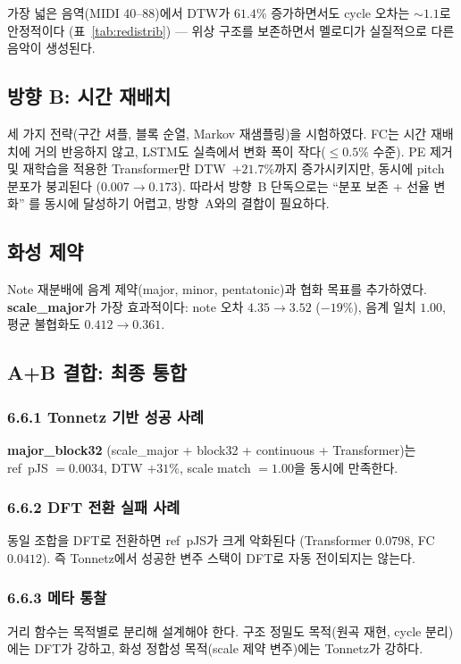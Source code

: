 \documentclass[11pt,a4paper]{article}
\begin{document}
가장 넓은 음역(MIDI 40--88)에서 DTW가 $61.4\%$ 증가하면서도
cycle 오차는 $\sim 1.1$로 안정적이다 (표~\ref{tab:redistrib}) ---
위상 구조를 보존하면서 멜로디가 실질적으로 다른 음악이 생성된다.

\subsection{방향 B: 시간 재배치}
\label{subsec:dirB}

세 가지 전략(구간 셔플, 블록 순열, Markov 재샘플링)을 시험하였다.
FC는 시간 재배치에 거의 반응하지 않고, LSTM도 실측에서 변화 폭이
작다($\le 0.5\%$ 수준). PE 제거 및 재학습을 적용한 Transformer만
DTW~$+21.7\%$까지 증가시키지만, 동시에 pitch 분포가 붕괴된다
($0.007 \to 0.173$). 따라서 방향~B 단독으로는 ``분포 보존 + 선율 변화''
를 동시에 달성하기 어렵고, 방향~A와의 결합이 필요하다.

\subsection{화성 제약}
\label{subsec:harmony}

Note 재분배에 음계 제약(major, minor, pentatonic)과 협화 목표를
추가하였다. \textbf{scale\_major}가 가장 효과적이다:
note 오차 $4.35 \to 3.52$ ($-19\%$), 음계 일치 $1.00$,
평균 불협화도 $0.412 \to 0.361$.

\subsection{A+B 결합: 최종 통합}
\label{subsec:combined_ab}

\subsubsection{6.6.1 Tonnetz 기반 성공 사례}
\textbf{major\_block32} (scale\_major + block32 + continuous +
Transformer)는 ref~pJS $=0.0034$, DTW $+31\%$, scale match $=1.00$을
동시에 만족한다.

\subsubsection{6.6.2 DFT 전환 실패 사례}
동일 조합을 DFT로 전환하면 ref~pJS가 크게 악화된다
(Transformer $0.0798$, FC $0.0412$). 즉 Tonnetz에서 성공한 변주 스택이
DFT로 자동 전이되지는 않는다.

\subsubsection{6.6.3 메타 통찰}
거리 함수는 목적별로 분리해 설계해야 한다.
구조 정밀도 목적(원곡 재현, cycle 분리)에는 DFT가 강하고,
화성 정합성 목적(scale 제약 변주)에는 Tonnetz가 강하다.
\end{document}
